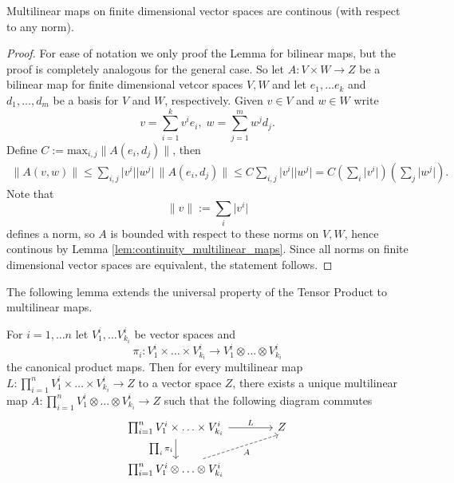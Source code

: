 \begin{lemma}
    Multilinear maps on finite dimensional vector spaces are continous (with respect to any norm).
\end{lemma}
\begin{proof}
    For ease of notation we only proof the Lemma for bilinear maps, but the proof is completely analogous for the general case. So let $A \colon V \times W \to Z$ be a bilinear map for finite dimensional vetcor spaces $V, W$ and let $e_1, \ldots e_k$ and $d_1,\ldots,d_m$ be a basis for $V$ and $W$, respectively. Given $v \in V$ and $w \in W$ write 
    \[
    v = \sum_{i = 1}^{k} v^i e_i, \; w = \sum_{j = 1}^{m} w^j d_j.
    \]
    Define $C := \mathrm{max}_{i,j} \lVert A(e_i,d_j) \rVert$, then
    \begin{align*}
        \lVert A(v,w) \rVert \leq \sum_{i,j} \lvert v^i \rvert \lvert w^j \rvert \, \lVert A(e_i,d_j) \rVert \leq C \sum_{i,j} \lvert v^i \rvert \lvert w^j \rvert = C \left(\sum_i \lvert v^i \rvert\right) \left(\sum_j \lvert w^j \rvert\right).
    \end{align*}
    Note that 
    \[
    \lVert v \rVert := \sum_i \lvert v^i \rvert
    \]
    defines a norm, so $A$ is bounded with respect to these norms on $V,W$, hence continous by Lemma \ref{lem:continuity_multilinear_maps}. Since all norms on finite dimensional vector spaces are equivalent, the statement follows.
\end{proof}

The following lemma extends the universal property of the Tensor Product to multilinear maps.

\begin{lemma}
    For $i = 1, \ldots n$ let $V_1^i, \ldots V_{k_i}^i$ be vector spaces and
    \[
    \pi_i \colon V_1^i \times \ldots \times V_{k_i}^i \to V_1^i \otimes \ldots \otimes V_{k_i}^i
    \]
    the canonical product maps. Then for every multilinear map $L \colon \prod_{i=1}^n V_1^i \times \ldots \times V_{k_i}^i \to Z$ to a vector space $Z$, there exists a unique multilinear map $A \colon \prod_{i=1}^n V_1^i \otimes \ldots \otimes V_{k_i}^i \to Z$
    such that the following diagram commutes
    \[\begin{tikzcd}[column sep = 4em]
	{\prod_{i=1}^n V_1^i \times \ldots \times V_{k_i}^i} & Z \\
	{\prod_{i=1}^n V_1^i \otimes \ldots \otimes V_{k_i}^i}
	\arrow["L", from=1-1, to=1-2]
	\arrow["{\prod_i\pi_i}"', from=1-1, to=2-1]
	\arrow["A"', dashed, end anchor = {[xshift = 5, yshift = -3]}, from=2-1, to=1-2]
\end{tikzcd}\]
\end{lemma}

